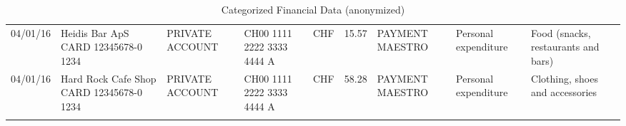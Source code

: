 \begin{landscape}
\begin{adjustwidth}{-2cm}{-2cm}
\begin{tiny}
\begin{longtable}{lp{4cm}llllp{3cm}ll}
		04/01/16 & Heidis Bar ApS CARD 12345678-0 1234 & PRIVATE ACCOUNT & CH00 1111 2222 3333 4444 A & CHF   & 15.57 & PAYMENT MAESTRO & Personal expenditure & Food (snacks, restaurants and bars) \\
		04/01/16 & Hard Rock Cafe Shop CARD 12345678-0 1234 & PRIVATE ACCOUNT & CH00 1111 2222 3333 4444 A & CHF   & 58.28 & PAYMENT MAESTRO & Personal expenditure & Clothing, shoes and accessories \\
	\caption{Categorized Financial Data (anonymized)}
	\label{tbl:catfinancialdata}
\end{longtable}%
\end{tiny}
\end{adjustwidth}
\end{landscape}